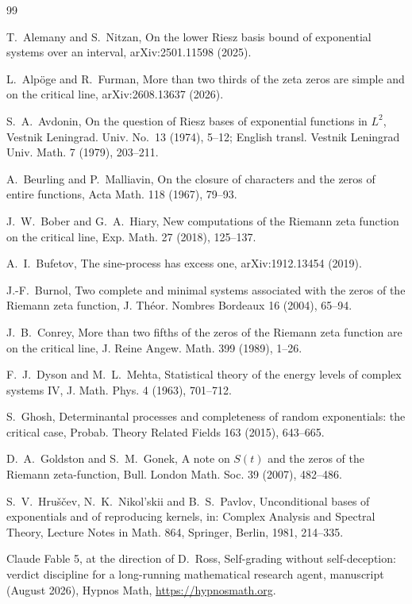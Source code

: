 \documentclass[11pt]{article}
\begin{document}
\begin{thebibliography}{99}

 T.~Alemany and S.~Nitzan, On the lower Riesz basis bound of exponential systems over an interval, arXiv:2501.11598 (2025).

 L.~Alp\"oge and R.~Furman, More than two thirds of the zeta zeros are simple and on the critical line, arXiv:2608.13637 (2026).

 S.~A.~Avdonin, On the question of Riesz bases of exponential functions in $L^2$, Vestnik Leningrad. Univ. No.~13 (1974), 5--12; English transl. Vestnik Leningrad Univ. Math. 7 (1979), 203--211.

 A.~Beurling and P.~Malliavin, On the closure of characters and the zeros of entire functions, Acta Math. 118 (1967), 79--93.

 J.~W.~Bober and G.~A.~Hiary, New computations of the Riemann zeta function on the critical line, Exp. Math. 27 (2018), 125--137.

 A.~I.~Bufetov, The sine-process has excess one, arXiv:1912.13454 (2019).

 J.-F.~Burnol, Two complete and minimal systems associated with the zeros of the Riemann zeta function, J. Th\'eor. Nombres Bordeaux 16 (2004), 65--94.

 J.~B.~Conrey, More than two fifths of the zeros of the Riemann zeta function are on the critical line, J. Reine Angew. Math. 399 (1989), 1--26.

 F.~J.~Dyson and M.~L.~Mehta, Statistical theory of the energy levels of complex systems IV, J. Math. Phys. 4 (1963), 701--712.

 S.~Ghosh, Determinantal processes and completeness of random exponentials: the critical case, Probab. Theory Related Fields 163 (2015), 643--665.

 D.~A.~Goldston and S.~M.~Gonek, A note on $S(t)$ and the zeros of the Riemann zeta-function, Bull. London Math. Soc. 39 (2007), 482--486.

 S.~V.~Hru\v{s}\v{c}ev, N.~K.~Nikol'skii and B.~S.~Pavlov, Unconditional bases of exponentials and of reproducing kernels, in: Complex Analysis and Spectral Theory, Lecture Notes in Math. 864, Springer, Berlin, 1981, 214--335.

 Claude Fable 5, at the direction of D.~Ross, Self-grading without self-deception: verdict discipline for a long-running mathematical research agent, manuscript (August 2026), Hypnos Math, \url{https://hypnosmath.org}.


\end{thebibliography}
\end{document}

